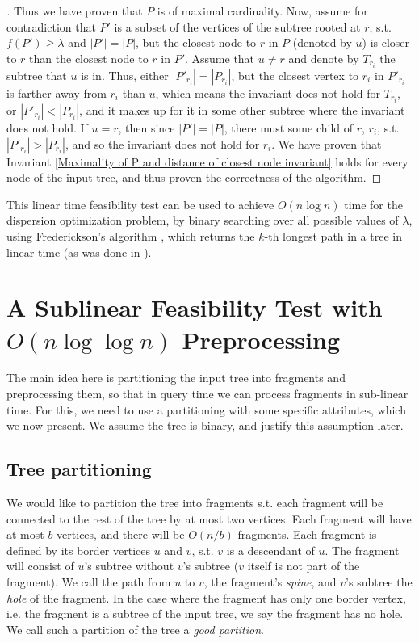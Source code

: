 \documentclass[11pt,a4paper]{article}
\theoremstyle{definition}
\theoremstyle{remark}
\begin{document}
\begin{proof}[\unskip\nopunct]
Thus we have proven that $P$ is of maximal cardinality. Now, assume for contradiction that $P'$ is a subset of the vertices of the subtree rooted at $r$, s.t. $f(P')\geq\lambda$ and $|P'| = |P|$, but the closest node to $r$ in $P$ (denoted by $u$) is closer to $r$ than the closest node to $r$ in $P'$. Assume that $u \neq r$ and denote by $T_{r_i}$ the subtree that $u$ is in. Thus, either $|P'_{r_i}| = |P_{r_i}|$, but the closest vertex to $r_i$ in $P'_{r_i}$ is farther away from $r_i$ than $u$, which means the invariant does not hold for $T_{r_i}$, or $|P'_{r_i}| < |P_{r_i}|$, and it makes up for it in some other subtree where the invariant does not hold. If $u=r$, then since $|P'| = |P|$, there must some child of $r$, $r_i$, s.t. $|P'_{r_i}| > |P_{r_i}|$, and so the invariant does not hold for $r_i$. We have proven that Invariant \ref{Maximality of P and distance of closest node invariant} holds for every node of the input tree, and thus proven the correctness of the algorithm. \end{proof}


This linear time feasibility test can be used to achieve $O(n \log n)$ time for the dispersion optimization problem, by binary searching over all possible values of $\lambda$, using Frederickson's algorithm \cite{Frederickson1983}, which returns the $k$-th longest path in a tree in linear time (as was done in \cite{Bhattacharya1991}).

\section{A Sublinear Feasibility Test with \boldmath
$O(n\log\log n)$ Preprocessing}\label{sublinear f.t.}
The main idea here is partitioning the input tree into fragments and preprocessing them, so that in query time we can process fragments in sub-linear time. For this, we need to use a partitioning with some specific attributes, which we now present. We assume the tree is binary, and justify this assumption later.
\subsection{Tree partitioning}\label{tree partitioning}
We would like to partition the tree into fragments s.t. each fragment will be connected to the rest of the tree by at most two vertices. Each fragment will have at most $b$ vertices, and there will be $O(n/b)$ fragments. Each fragment is defined by its border vertices $u$ and $v$, s.t. $v$ is a descendant of $u$. The fragment will consist of $u$'s subtree without $v$'s subtree ($v$ itself is not part of the fragment). We call the path from $u$ to $v$, the fragment's \textit{spine}, and $v$'s subtree the \textit{hole} of the fragment. In the case where the fragment has only one border vertex, i.e. the fragment is a subtree of the input tree, we say the fragment has no hole. We call such a partition of the tree a \emph{good partition}.
\end{document}
